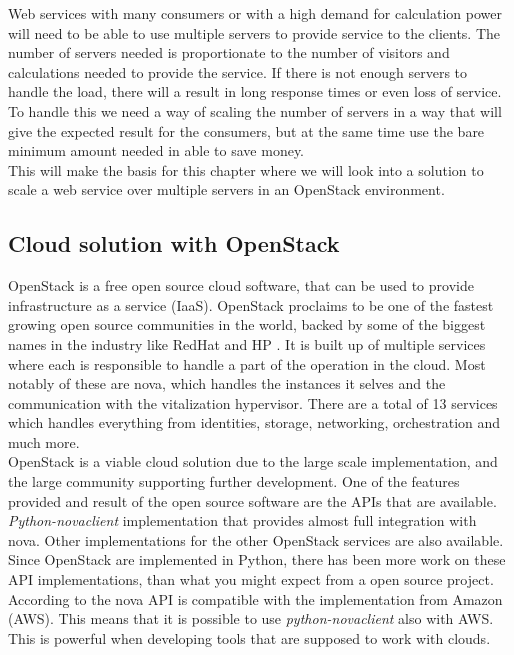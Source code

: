 Web services with many consumers or with a high demand for calculation power
will need to be able to use multiple servers to provide service to the clients.
The number of servers needed is proportionate to the number of visitors and
calculations needed to provide the service. If there is not enough servers to
handle the load, there will a result in long response times or even loss of
service.\\

To handle this we need a way of scaling the number of servers in a way that
will give the expected result for the consumers, but at the same time use the
bare minimum amount needed in able to save money.\\

This will make the basis for this chapter where we will look into a solution to
scale a web service over multiple servers in an OpenStack environment.

\subsection{Cloud solution with OpenStack}
OpenStack is a free open source cloud software, that can be used to provide
infrastructure as a service (IaaS). 
OpenStack proclaims to be one of the fastest growing open source communities in
the world, backed by some of the biggest names in the industry like
RedHat and HP \cite{OpenStack:2014}. It is built up of multiple services
where each is responsible to handle a part of the operation in the cloud. Most
notably of these are nova, which handles the instances it selves and the
communication with the vitalization hypervisor. There are a total of 13
services which handles everything from identities, storage, networking,
orchestration and much more.\\

OpenStack is a viable cloud solution due to the large scale implementation, and
the large community supporting further development. One of the features provided 
and result of the open source software are the APIs that are available. 
\textit{Python-novaclient} implementation that provides almost full integration
with nova. Other implementations for the other OpenStack services are also
available. Since OpenStack are implemented in Python, there has been more work
on these API implementations, than what you might expect from a open source
project. According to \cite{OpenStack:api_comparison} the nova API is
compatible with the implementation from Amazon (AWS). This means that it is
possible to use \textit{python-novaclient} also with AWS. This is powerful when
developing tools that are supposed to work with clouds.

